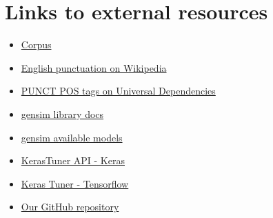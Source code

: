 \documentclass[11pt]{article}
\begin{document}
\section{Links to external resources}
\label{sec:links}

\begin{itemize}
    \item \href{https://raw.githubusercontent.com/nltk/nltk_data/gh-pages/packages/corpora/dependency_treebank.zip}{Corpus}
    \item \href{https://en.wikipedia.org/wiki/English_punctuation}{English punctuation on Wikipedia}
    \item \href{https://universaldependencies.org/docs/en/pos/all.html#al-en-pos/PUNCT}{PUNCT POS tags on Universal Dependencies}
    \item \href{https://radimrehurek.com/gensim/auto_examples/index.html}{gensim library docs}
    \item \href{https://github.com/RaRe-Technologies/gensim-data#models}{gensim available models}
    \item \href{https://keras.io/api/keras_tuner/}{KerasTuner API - Keras}
    \item \href{https://www.tensorflow.org/tutorials/keras/keras_tuner}{Keras Tuner - Tensorflow}
    \item \href{https://github.com/Danysan1/ai-unibo-nlp-project}{Our GitHub repository}
\end{itemize}



%


\end{document}

